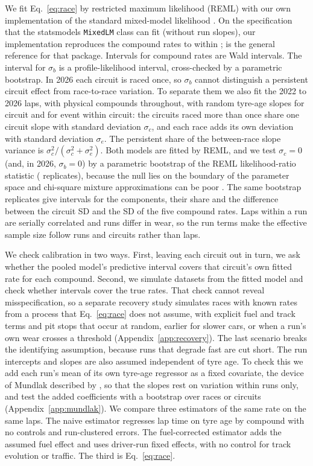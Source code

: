 We fit Eq.~\eqref{eq:race} by restricted maximum likelihood (REML) with our own implementation of the standard mixed-model likelihood \citep{bates2015lme4}.
On the specification that the statsmodels \texttt{MixedLM} class can fit (without run slopes), our implementation reproduces the compound rates to within \EngineRateDiff\spl; \citet{seabold2010statsmodels} is the general reference for that package.
Intervals for compound rates are Wald intervals.
The interval for $\sigma_b$ is a profile-likelihood interval, cross-checked by a parametric bootstrap.
In 2026 each circuit is raced once, so $\sigma_b$ cannot distinguish a persistent circuit effect from race-to-race variation.
To separate them we also fit the 2022 to 2026 laps, with physical compounds throughout, with random tyre-age slopes for circuit and for event within circuit: the \PooledNRepeat{} circuits raced more than once share one circuit slope with standard deviation $\sigma_c$, and each race adds its own deviation with standard deviation $\sigma_e$.
The persistent share of the between-race slope variance is $\sigma_c^2/(\sigma_c^2+\sigma_e^2)$.
Both models are fitted by REML, and we test $\sigma_c=0$ (and, in 2026, $\sigma_b=0$) by a parametric bootstrap of the REML likelihood-ratio statistic (\CircuitNBoot{} replicates), because the null lies on the boundary of the parameter space and chi-square mixture approximations can be poor \citep{crainiceanu2004likelihood}.
The same bootstrap replicates give intervals for the components, their share and the difference between the circuit SD and the SD of the five compound rates.
Laps within a run are serially correlated and runs differ in wear, so the run terms make the effective sample size follow runs and circuits rather than laps.

We check calibration in two ways.
First, leaving each circuit out in turn, we ask whether the pooled model's predictive interval covers that circuit's own fitted rate for each compound.
Second, we simulate datasets from the fitted model and check whether intervals cover the true rates.
That check cannot reveal misspecification, so a separate recovery study simulates races with known rates from a process that Eq.~\eqref{eq:race} does not assume, with explicit fuel and track terms and pit stops that occur at random, earlier for slower cars, or when a run's own wear crosses a threshold (Appendix~\ref{app:recovery}).
The last scenario breaks the identifying assumption, because runs that degrade fast are cut short.
The run intercepts and slopes are also assumed independent of tyre age.
To check this we add each run's mean of its own tyre-age regressor as a fixed covariate, the device of Mundlak described by \citet[pp.~1056--1057]{bell2019fixed}, so that the slopes rest on variation within runs only, and test the added coefficients with a bootstrap over races or circuits (Appendix~\ref{app:mundlak}).
We compare three estimators of the same rate on the same laps.
The naive estimator regresses lap time on tyre age by compound with no controls and run-clustered errors.
The fuel-corrected estimator adds the assumed fuel effect and uses driver-run fixed effects, with no control for track evolution or traffic.
The third is Eq.~\eqref{eq:race}.


